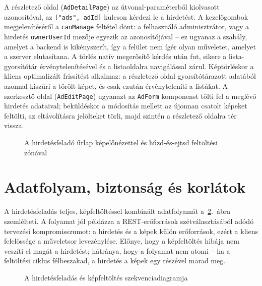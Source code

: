 A részletező oldal (\texttt{AdDetailPage}) az útvonal-paraméterből kiolvasott azonosítóval, az
\texttt{["ads", adId]} kulcson kérdezi le a hirdetést. A kezelőgombok megjelenítéséről a
\texttt{canManage} feltétel dönt: a felhasználó adminisztrátor, vagy a hirdetés
\texttt{ownerUserId} mezője egyezik az azonosítójával -- ez ugyanaz a szabály, amelyet a backend
is kikényszerít, így a felület nem ígér olyan műveletet, amelyet a szerver elutasítana. A törlés
natív megerősítő kérdés után fut, sikere a lista-gyorsítótár érvénytelenítésével és a listaoldalra
navigálással zárul. Képtörléskor a kliens optimalizált frissítést alkalmaz: a részletező oldal
gyorsítótárazott adatából azonnal kiszűri a törölt képet, és csak ezután érvényteleníti a
listákat. A szerkesztő oldal (\texttt{AdEditPage}) ugyanazt az \texttt{AdForm} komponenst tölti
fel a meglévő hirdetés adataival; beküldéskor a módosítás mellett az újonnan csatolt képeket
feltölti, az eltávolításra jelölteket törli, majd szintén a részletező oldalra tér vissza.

\begin{figure}[htbp]
	\centering
	\caption{A hirdetésfeladó űrlap képelőnézettel és húzd-és-ejtsd feltöltési zónával}
	\label{fig:ad-form-screen}
\end{figure}

\section{Adatfolyam, biztonság és korlátok}
\label{sec:ads-adatfolyam}

A hirdetésfeladás teljes, képfeltöltéssel kombinált adatfolyamát
a~\ref{fig:ad-create-sequence}.~ábra szemlélteti. A folyamat jól példázza a REST-erőforrások
szétválasztásából adódó tervezési kompromisszumot: a hirdetés és a képek külön erőforrások, ezért
a kliens felelőssége a műveletsor levezénylése. Előnye, hogy a képfeltöltés hibája nem veszíti el
magát a hirdetést; hátránya, hogy a folyamat nem atomi -- ha a feltöltési ciklus félbeszakad, a
hirdetés a képek egy részével marad meg.

\begin{figure}[htbp]
	\centering
	\caption{A hirdetésfeladás és képfeltöltés szekvenciadiagramja}
	\label{fig:ad-create-sequence}
\end{figure}

